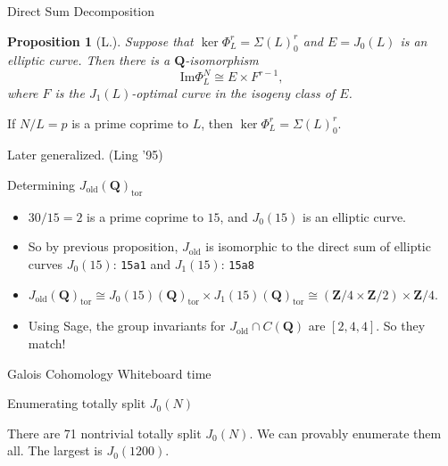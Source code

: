 \documentclass{beamer}
\newtheorem{proposition}[theorem]{Proposition}
\newcommand{\QQ}{\mathbf{Q}}
\newcommand{\ZZ}{\mathbf{Z}}
\renewcommand{\ZZ}{\mathbf{Z}}
\renewcommand{\Im}{\mathrm{Im}}
\newcommand{\tor}{\mathrm{tor}}
\newcommand{\old}{\mathrm{old}}
\begin{document}
\begin{frame}{Direct Sum Decomposition}
    \begin{proposition}[L.]
        Suppose that $\ker\Phi_L ^r = \Sigma(L)_0 ^r$ and $E=J_0(L)$ is an elliptic
        curve. Then there is a $\QQ$-isomorphism
        \[
            \Im\Phi_L ^N \cong E \times F^{r-1},
        \]
        where $F$ is the $J_1(L)$-optimal curve in the isogeny class of $E$.
    \end{proposition}
    \pause
    \begin{theorem}[Ribet '90]
        If $N/L=p$ is a prime coprime to $L$, then $\ker\Phi_L ^r = \Sigma(L)_0
        ^r$.
    \end{theorem}
    Later generalized. (Ling '95)
\end{frame}

\begin{frame}{Determining $J_\old(\QQ)_\tor$}
    \begin{itemize}
        \item
            $30/15=2$ is a prime coprime to $15$, and $J_0(15)$ is an
            elliptic curve.
        \item
            So by previous proposition, $J_\old$ is
            isomorphic to the direct sum of elliptic curves $J_0(15)$:
            \texttt{15a1} and $J_1(15)$: \texttt{15a8}
            \pause
        \item
            $J_\old(\QQ)_\tor\cong J_0(15)(\QQ)_\tor \times J_1(15)(\QQ)_\tor
            \cong (\ZZ/4\times \ZZ/2)\times \ZZ/4$.
            \pause
        \item
            Using Sage, the group invariants for $J_\old \cap C(\QQ)$ are
            $[2,4,4]$. So they match!
    \end{itemize}
\end{frame}

\begin{frame}[standout]{Galois Cohomology}
    \Huge{Whiteboard time}
\end{frame}



\begin{frame}{Enumerating totally split $J_0(N)$}
    \begin{theorem}[L.]
        There are 71 nontrivial totally split $J_0(N)$. We can provably
        enumerate them all. The largest is $J_0(1200)$.
    \end{theorem}
\end{frame}
\end{document}

